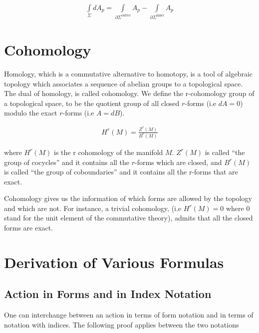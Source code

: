 \documentclass[a4paper,notitlepage]{report}
\begin{document}
\begin{align}
\int\limits_{\Sigma} dA_p =  \int\limits_{\partial \Sigma^{\text{outter}}} A_p - \int\limits_{\partial \Sigma^{\text{inner}}} A_p
\end{align}

\chapter{Cohomology} \label{ABC}

Homology, which is a commutative alternative to homotopy, is a tool of algebraic topology which associates a sequence of abelian groups to a topological space. The dual of homology, is called cohomology. We define the r-cohomology group of a topological space, to be the quotient group of all closed $r$-forms (i.e $dA=0$) modulo the exact $r$-forms (i.e $A=dB$).

\begin{align}
H^r(M) = \frac{Z^r(M)}{B^r(M)}
\end{align}

\vspace{0.5em}

where $H^r(M)$ is the r cohomology of the manifold $M$. $Z^r(M)$ is called ``the group of cocycles'' and it contains all the $r$-forms which are closed, and $B^r(M)$ is called ``the group of coboundaries'' and it contains all the r-forms that are exact. 

Cohomology gives us the information of which forms are allowed by the topology and which are not. For instance, a trivial cohomology, (i.e $H^r(M)=0$ where 0 stand for the unit element of the commutative theory), admits that all the closed forms are exact.


\chapter{Derivation of Various Formulas}

\section{Action in Forms and in Index Notation}  \label{ABC1}

One can interchange between an action in terms of form notation and in terms of notation with indices. The following proof applies between the two notations
\end{document}
